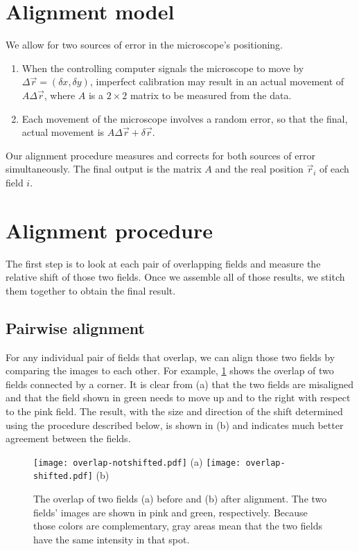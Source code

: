 \documentclass{article}
\begin{document}
\section{Alignment model}

We allow for two sources of error in the microscope's positioning.
\begin{enumerate}
\item When the controlling computer signals the microscope to move by $\Delta \vec{r}=(\delta x, \delta y)$, imperfect calibration may result in an actual movement of $A\Delta\vec{r}$, where $A$ is a $2\times2$ matrix to be measured from the data. \label{systematicerror}
\item Each movement of the microscope involves a random error, so that the final, actual movement is $A\Delta\vec{r}+\delta\vec{r}$. \label{randomerror}
\end{enumerate}
Our alignment procedure measures and corrects for both sources of error simultaneously.  The final output is the matrix $A$ and the real position $\vec{r}_i$ of each field $i$.

\section{Alignment procedure}

The first step is to look at each pair of overlapping fields and measure the relative shift of those two fields.  Once we assemble all of those results, we stitch them together to obtain the final result.

\subsection{Pairwise alignment}

For any individual pair of fields that overlap, we can align those two fields by comparing the images to each other.  For example, \cref{fig:overlap} shows the overlap of two fields connected by a corner.  It is clear from (a) that the two fields are misaligned and that the field shown in green needs to move up and to the right with respect to the pink field.  The result, with the size and direction of the shift determined using the procedure described below, is shown in (b) and indicates much better agreement between the fields.

\begin{figure}[ht]
	\centering
	\begin{multicols}{2}
	\texttt{[image: overlap-notshifted.pdf]} (a)
	\texttt{[image: overlap-shifted.pdf]} (b)
	\end{multicols}
	\caption{The overlap of two fields (a) before and (b) after alignment.  The two fields' images are shown in pink and green, respectively.  Because those colors are complementary, gray areas mean that the two fields have the same intensity in that spot.}
	\label{fig:overlap}
\end{figure}
\end{document}
